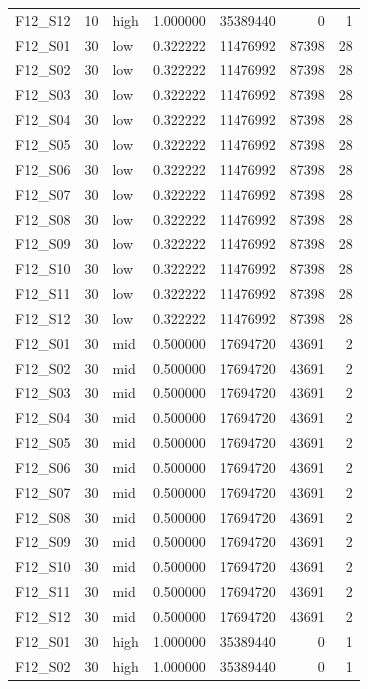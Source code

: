 \begin{longtable}{lllr r r r}
F12\_S12 & 10 & high & 1.000000 & 35389440 & 0 & 1 \\
F12\_S01 & 30 & low & 0.322222 & 11476992 & 87398 & 28 \\
F12\_S02 & 30 & low & 0.322222 & 11476992 & 87398 & 28 \\
F12\_S03 & 30 & low & 0.322222 & 11476992 & 87398 & 28 \\
F12\_S04 & 30 & low & 0.322222 & 11476992 & 87398 & 28 \\
F12\_S05 & 30 & low & 0.322222 & 11476992 & 87398 & 28 \\
F12\_S06 & 30 & low & 0.322222 & 11476992 & 87398 & 28 \\
F12\_S07 & 30 & low & 0.322222 & 11476992 & 87398 & 28 \\
F12\_S08 & 30 & low & 0.322222 & 11476992 & 87398 & 28 \\
F12\_S09 & 30 & low & 0.322222 & 11476992 & 87398 & 28 \\
F12\_S10 & 30 & low & 0.322222 & 11476992 & 87398 & 28 \\
F12\_S11 & 30 & low & 0.322222 & 11476992 & 87398 & 28 \\
F12\_S12 & 30 & low & 0.322222 & 11476992 & 87398 & 28 \\
F12\_S01 & 30 & mid & 0.500000 & 17694720 & 43691 & 2 \\
F12\_S02 & 30 & mid & 0.500000 & 17694720 & 43691 & 2 \\
F12\_S03 & 30 & mid & 0.500000 & 17694720 & 43691 & 2 \\
F12\_S04 & 30 & mid & 0.500000 & 17694720 & 43691 & 2 \\
F12\_S05 & 30 & mid & 0.500000 & 17694720 & 43691 & 2 \\
F12\_S06 & 30 & mid & 0.500000 & 17694720 & 43691 & 2 \\
F12\_S07 & 30 & mid & 0.500000 & 17694720 & 43691 & 2 \\
F12\_S08 & 30 & mid & 0.500000 & 17694720 & 43691 & 2 \\
F12\_S09 & 30 & mid & 0.500000 & 17694720 & 43691 & 2 \\
F12\_S10 & 30 & mid & 0.500000 & 17694720 & 43691 & 2 \\
F12\_S11 & 30 & mid & 0.500000 & 17694720 & 43691 & 2 \\
F12\_S12 & 30 & mid & 0.500000 & 17694720 & 43691 & 2 \\
F12\_S01 & 30 & high & 1.000000 & 35389440 & 0 & 1 \\
F12\_S02 & 30 & high & 1.000000 & 35389440 & 0 & 1 \\

\end{longtable}
